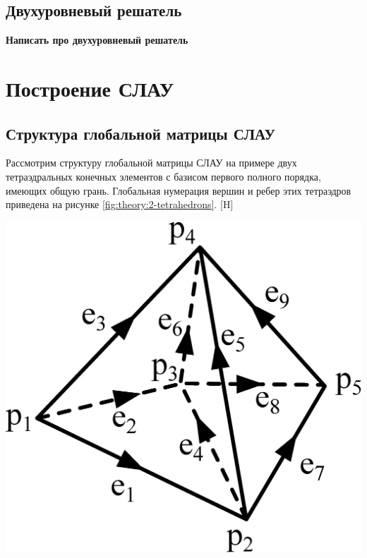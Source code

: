 \documentclass[a4paper,14pt]{article}
\makeatletter
\renewenvironment{figure}[1][\fps@figure]{
  \edef\@tempa{\noexpand\@float{figure}[#1]}
  \@tempa
  \addtocounter{foofigure}{1}
}{
  \end@float
}
\makeatother
\begin{document}

\subsection{Двухуровневый решатель}
{\color{red}\textbf{Написать про двухуровневый решатель}}


\clearpage
\section{Построение СЛАУ}
\subsection{Структура глобальной матрицы СЛАУ}
Рассмотрим структуру глобальной матрицы СЛАУ на примере двух тетраэдральных конечных элементов с базисом первого полного порядка, имеющих общую грань. Глобальная нумерация вершин и ребер этих тетраэдров приведена на рисунке \ref{fig:theory:2-tetrahedrons}.
\begin{figure}[H]
	\centering
	\includegraphics[scale=0.25]{theory/2-tetrahedrons.eps}
	\caption{два тетраэдральных конечных элемента}
	\label{fig:theory:2-tetrahedrons}
\end{figure}
\end{document}

